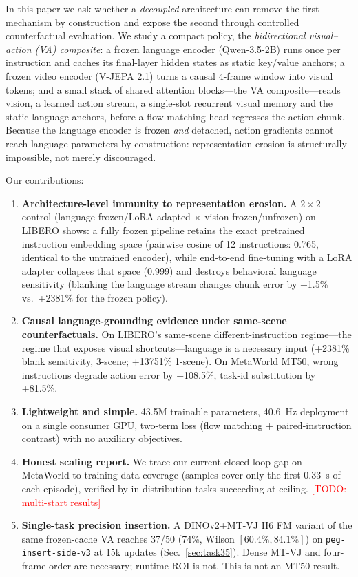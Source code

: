 \documentclass[10pt,twocolumn]{article}
\newcommand{\todo}[1]{\textcolor{red}{[TODO: #1]}}
\begin{document}
In this paper we ask whether a \emph{decoupled} architecture can remove the
first mechanism by construction and expose the second through controlled
counterfactual evaluation. We study a compact policy, the
\emph{bidirectional visual--action (VA) composite}: a frozen language encoder
(Qwen-3.5-2B) runs once per instruction and caches its final-layer hidden
states as static key/value anchors; a frozen video encoder (V-JEPA 2.1) turns
a causal 4-frame window into visual tokens; and a small stack of shared
attention blocks---the VA composite---reads vision, a learned action stream,
a single-slot recurrent visual memory and the static language anchors, before
a flow-matching head regresses the action chunk. Because the language encoder
is frozen \emph{and} detached, action gradients cannot reach language
parameters by construction: representation erosion is structurally
impossible, not merely discouraged.

Our contributions:
\begin{enumerate}
\item \textbf{Architecture-level immunity to representation erosion.} A
$2\times2$ control (language frozen/LoRA-adapted $\times$ vision
frozen/unfrozen) on LIBERO shows: a fully frozen pipeline retains the exact
pretrained instruction embedding space (pairwise cosine of 12 instructions:
0.765, identical to the untrained encoder), while end-to-end fine-tuning with
a LoRA adapter collapses that space (0.999) and destroys behavioral language
sensitivity (blanking the language stream changes chunk error by +1.5\%
vs.\ +2381\% for the frozen policy).
\item \textbf{Causal language-grounding evidence under same-scene
counterfactuals.} On LIBERO's same-scene different-instruction regime---the
regime that exposes visual shortcuts---language is a necessary input
(+2381\% blank sensitivity, 3-scene; +13751\% 1-scene). On MetaWorld MT50,
wrong instructions degrade action error by +108.5\%, task-id substitution by
+81.5\%.
\item \textbf{Lightweight and simple.} 43.5M trainable parameters, 40.6~Hz
deployment on a single consumer GPU, two-term loss
(flow matching + paired-instruction contrast) with no auxiliary objectives.
\item \textbf{Honest scaling report.} We trace our current closed-loop gap on
MetaWorld to training-data coverage (samples cover only the first 0.33~s of
each episode), verified by in-distribution tasks succeeding at ceiling.
\todo{multi-start results}
\item \textbf{Single-task precision insertion.} A DINOv2+MT-VJ H6 FM
variant of the same frozen-cache VA reaches 37/50 (74\%, Wilson
$[60.4\%,84.1\%]$) on \texttt{peg-insert-side-v3} at 15k updates
(Sec.~\ref{sec:task35}). Dense MT-VJ and four-frame order are necessary;
runtime ROI is not. This is not an MT50 result.
\end{enumerate}
\end{document}
